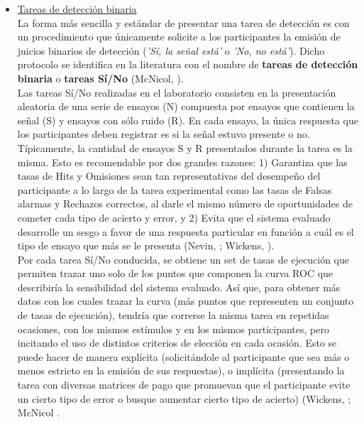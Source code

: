 \begin{itemize}
\item \underline{Tareas de detección binaria}\\

La forma más sencilla y estándar de presentar una tarea de detección es con un procedimiento que únicamente solicite a los participantes la emisión de juicios binarios de detección (\textit{'Sí, la señal está'} o \textit{'No, no está'}). Dicho protocolo se identifica en la literatura con el nombre de \textbf{tareas de detección binaria} o \textbf{tareas Sí/No} (McNicol, \citeyear{McNicol2}).\\

Las tareas Sí/No realizadas en el laboratorio consisten en la presentación aleatoria de una serie de ensayos (N) compuesta por ensayos que contienen la señal (S) y ensayos con sólo ruido (R). En cada ensayo, la única respuesta que los participantes deben registrar es si la señal estuvo presente o no.\\

Típicamente, la cantidad de ensayos S y R presentados durante la tarea es la misma. Esto es recomendable por dos grandes razones: 1) Garantiza que las tasas de Hits y Omisiones sean tan representativas del desempeño del participante a lo largo de la tarea experimental como las tasas de Falsas alarmas y Rechazos correctos, al darle el mismo número de oportunidades de cometer cada tipo de acierto y error, y 2) Evita que el sistema evaluado desarrolle un sesgo a favor de una respuesta particular en función a cuál es el tipo de ensayo que más se le presenta (Nevin, \citeyear{Nevin1969}; Wickens, \citeyear{Wickens1}).\\

Por cada tarea Sí/No conducida, se obtiene un set de tasas de ejecución que permiten trazar uno solo de los puntos que componen la curva ROC que describiría la sensibilidad del sistema evaluado. Así que, para obtener más datos con los cuales trazar la curva (más puntos que representen un conjunto de tasas de ejecución), tendría que correrse la misma tarea en repetidas ocasiones, con los mismos estímulos y en los mismos participantes, pero incitando el uso de distintos criterios de elección en cada ocasión. Esto se puede hacer de manera explícita (solicitándole al participante que sea más o menos estricto en la emisión de sus respuestas), o implícita (presentando la tarea con diversas matrices de pago que promuevan que el participante evite un cierto tipo de error o busque aumentar cierto tipo de acierto) (Wickens, \citeyear{Wickens1}; McNicol \citeyear{McNicol2}.\\


\end{itemize}
